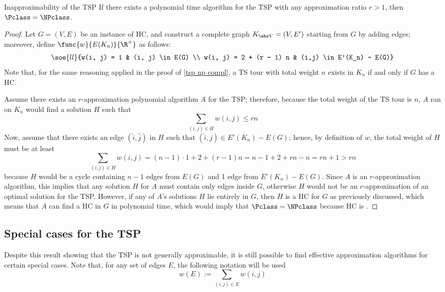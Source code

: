 \documentclass[a4paper, 12pt]{report}
\begin{document}
    \begin{framedthm}{Inapproximability of the TSP}
        If there exists a polynomial time algorithm for the TSP with any approximation ratio $r > 1$, then $\Pclass = \NPclass$.
    \end{framedthm}

    \begin{proof}
        Let $G = (V, E)$ be an instance of HC, and construct a complete graph $K_{\abs V} = (V, E')$ starting from $G$ by adding edges; moreover, define $\func{w}{E(K_n)}{\R^+}$ as follows: $$\soe{ll}{w(i, j) = 1 & (i, j) \in E(G) \\ w(i, j) = 2 + (r - 1) n & (i,j) \in E'(K_n) - E(G)}$$ Note that, for the same reasoning applied in the proof of \cref{tsp np compl}, a TS tour with total weight $n$ exists in $K_n$ if and only if $G$ has a HC.

        Assume there exists an $r$-approximation polynomial algorithm $A$ for the TSP; therefore, because the total weight of the TS tour is $n$, $A$ ran on $K_n$ would find a solution $H$ such that $$\sum_{(i, j) \in H} {w(i, j)} \le rn$$ Now, assume that there exists an edge $(\hat i, \hat j)$ in $H$ such that $(\hat i, \hat j) \in E'(K_n) - E(G)$; hence, by definition of $w$, the total weight of $H$ must be at least $$\sum_{(i, j) \in H}{w(i, j)} = (n - 1) \cdot 1  + 2 + (r - 1)n = n - 1 + 2 + rn - n = rn + 1 > rn$$ because $H$ would be a cycle containing $n - 1$ edges from $E(G)$ and 1 edge from $E'(K_n) - E(G)$. Since $A$ is an $r$-approximation algorithm, this implies that any solution $H$ for $A$ must contain only edges inside $G$, otherwise $H$ would not be an $r$-approximation of an optimal solution for the TSP. However, if any of $A$'s solutions $H$ lie entirely in $G$, then $H$ is a HC for $G$ as previously discussed, which means that $A$ can find a HC in $G$ in polynomial time, which would imply that $\Pclass = \NPclass$ because HC is \NPComplete.
    \end{proof}

    \subsection{Special cases for the TSP}

    Despite this result showing that the TSP is not generally approximable, it is still possible to find effective approximation algorithms for certain special cases. Note that, for any set of edges $E$, the following notation will be used $$w(E) := \sum_{(i, j) \in E}{w(i,j)}$$
    
\end{document}
